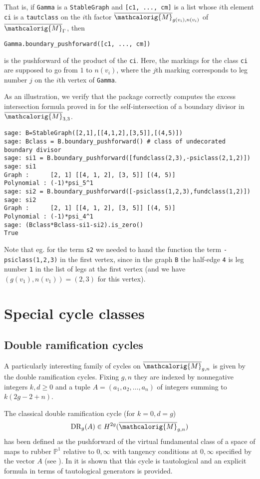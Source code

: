 \documentclass[11pt]{article}
\newcommand{\M}{\ensuremath{\overline{\mathcalorig{M}}}}
\newcommand{\DR}{\mathrm{DR}}
\begin{document}
That is, if \texttt{Gamma} is a \texttt{StableGraph} and \texttt{[c1, ..., cm]} is a list whose $i$th element \texttt{ci} is a \texttt{tautclass} on the $i$th factor $\M_{g(v_i),n(v_i)}$ of $\M_\Gamma$, then
\begin{center} \verb|Gamma.boundary_pushforward([c1, ..., cm])| \end{center} is the pushforward of the product of the \texttt{ci}. Here, the markings for the class \texttt{ci} are supposed to go from $1$ to $n(v_i)$, where the $j$th marking corresponds to leg number $j$ on the $i$th vertex of \texttt{Gamma}.

As an illustration, we verify that the package correctly computes the excess intersection formula proved in \cite{Graber2001} for the self-intersection of a boundary divisor in $\M_{3,3}$.
\begin{lstlisting}
sage: B=StableGraph([2,1],[[4,1,2],[3,5]],[(4,5)])
sage: Bclass = B.boundary_pushforward() # class of undecorated boundary divisor
sage: si1 = B.boundary_pushforward([fundclass(2,3),-psiclass(2,1,2)])
sage: si1
Graph :      [2, 1] [[4, 1, 2], [3, 5]] [(4, 5)]
Polynomial : (-1)*psi_5^1
sage: si2 = B.boundary_pushforward([-psiclass(1,2,3),fundclass(1,2)])
sage: si2
Graph :      [2, 1] [[4, 1, 2], [3, 5]] [(4, 5)]
Polynomial : (-1)*psi_4^1
sage: (Bclass*Bclass-si1-si2).is_zero()
True
\end{lstlisting}
Note that eg. for the term \texttt{s2} we needed to hand the function the term \texttt{-psiclass(1,2,3)} in the first vertex, since in the graph \texttt{B} the half-edge \texttt{4} is leg number \texttt{1} in the list of legs at the first vertex (and we have $(g(v_1),n(v_1))=(2,3)$ for this vertex).


\section{Special cycle classes}
\subsection{Double ramification cycles} \label{Sect:DR}
A particularly interesting family of cycles on $\M_{g,n}$ is given by the double ramification cycles. Fixing $g,n$ they are indexed by nonnegative integers $k,d \geq 0$ and a tuple $A=(a_1,a_2, \ldots, a_n)$ of integers summing to $k(2g-2+n)$.

The classical double ramification cycle (for $k=0,d=g$)
\[\DR_g(A) \in H^{2g}(\M_{g,n})\]
has been defined as the pushforward of the virtual fundamental class of a space of maps to rubber $\mathbb{P}^1$ relative to $0, \infty$ with tangency conditions at $0, \infty$ specified by the vector $A$ (see \cite{liruan, Li2002A-degeneration-, Li2001Stable-morphism,Graber2005Relative-virtua}). In \cite{Janda2016Double-ramifica} it is shown  that this cycle is tautological and an explicit formula in terms of tautological generators is provided.
\end{document}
